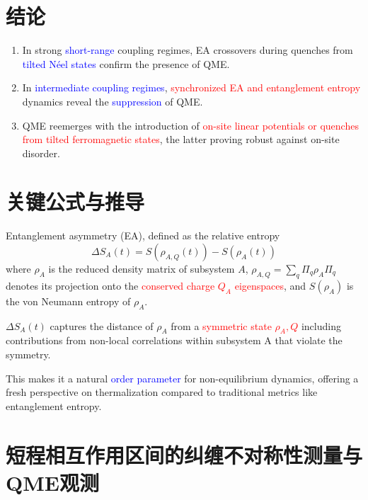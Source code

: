 \documentclass[11pt,a4paper]{article}
\begin{document}
\section{结论}
\begin{enumerate}
    \item In strong \textcolor{blue}{short-range} coupling regimes, EA crossovers during quenches from \textcolor{blue}{tilted Néel states} confirm the presence of QME.
    \item In \textcolor{blue}{intermediate coupling regimes}, \textcolor{red}{synchronized EA and entanglement entropy} dynamics reveal the \textcolor{blue}{suppression} of QME.
    \item QME reemerges with the introduction of \textcolor{red}{on-site linear potentials or quenches from tilted ferromagnetic states}, the latter proving robust against on-site disorder.
\end{enumerate}


\section{关键公式与推导}
Entanglement asymmetry (EA), defined as the relative entropy
\begin{equation}
\Delta S_A(t)=S\left(\rho_{A, Q}(t)\right)-S\left(\rho_A(t)\right)
\end{equation}
where $\rho_A$ is the reduced density matrix of subsystem $A$, $\rho_{A, Q}=\sum_q \Pi_q \rho_A \Pi_q$ denotes its projection onto the \textcolor{red}{conserved charge $Q_A$ eigenspaces}, and $S\left(\rho_A\right)$ is the von Neumann entropy of $\rho_A$. 

$\Delta S_A(t)$ captures the distance of $\rho_A$ from a \textcolor{red}{symmetric state $\rho_A,Q$} including contributions from non-local correlations within subsystem A that violate the symmetry.

This makes it a natural \textcolor{blue}{order parameter} for non-equilibrium dynamics, offering a fresh perspective on thermalization compared to traditional metrics like entanglement entropy.



\section{短程相互作用区间的纠缠不对称性测量与QME观测}
\end{document}
